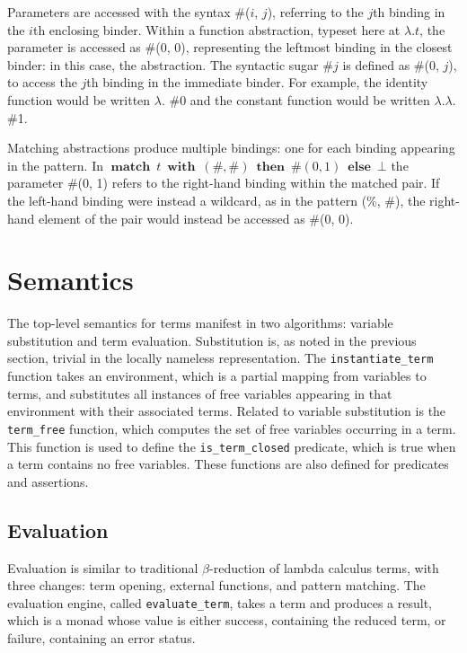 \documentclass[12pt]{article}
\DeclareMathOperator{\tmatch}{\mathbf{match}}
\DeclareMathOperator{\twith}{\mathbf{with}}
\DeclareMathOperator{\tthen}{\mathbf{then}}
\DeclareMathOperator{\telse}{\mathbf{else}}
\newcommand{\Match}[4]{
  \tmatch\ #1\ \twith\ #2\ \tthen\ #3\ \telse\ #4
}
\begin{document}
Parameters are accessed with the syntax \#($i$, $j$), referring to the
$j$th binding in the $i$th enclosing binder.  Within a function
abstraction, typeset here at $\lambda. t$, the parameter is accessed as
\#(0, 0), representing the leftmost binding in the closest binder: in
this case, the abstraction. The syntactic sugar \#$j$ is defined as
\#(0, $j$), to access the $j$th binding in the immediate binder.  For
example, the identity function would be written $\lambda.$ \#0 and the
constant function would be written $\lambda. \lambda.$ \#1.

Matching abstractions produce multiple bindings: one for each binding
appearing in the pattern. In $\Match{t}{(\#, \#)}{\#(0, 1)}{\bot}$
the parameter \#(0, 1) refers to the right-hand binding within the
matched pair.  If the left-hand binding were instead a wildcard, as in
the pattern (\%, \#), the right-hand element of the pair would instead
be accessed as \#(0, 0).

\section{Semantics}

The top-level semantics for terms manifest in two algorithms: variable
substitution and term evaluation.  Substitution is, as noted in the
previous section, trivial in the locally nameless representation.  The
\texttt{instantiate\_term} function takes an environment, which is a
partial mapping from variables to terms, and substitutes all instances
of free variables appearing in that environment with their associated
terms.  Related to variable substitution is the \texttt{term\_free}
function, which computes the set of free variables occurring in a term.
This function is used to define the \texttt{is\_term\_closed} predicate,
which is true when a term contains no free variables.  These functions
are also defined for predicates and assertions.

\subsection{Evaluation}

Evaluation is similar to traditional $\beta$-reduction of lambda
calculus terms, with three changes: term opening, external functions,
and pattern matching.  The evaluation engine, called
\texttt{evaluate\_term}, takes a term and produces a result, which is a
monad whose value is either success, containing the reduced term, or
failure, containing an error status.
\end{document}
